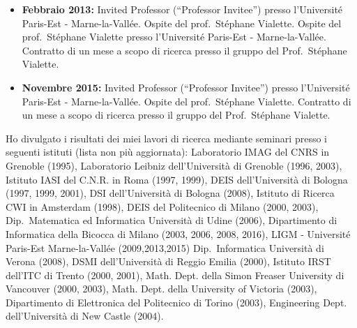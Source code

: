 \begin{itemize}
            Contratto di un mese a scopo di ricerca presso il gruppo del Prof.~St\'ephane Vialette.
      \item[] {\bf Febbraio 2013:} 
            Invited Professor (“Professor Invitee”) 
            presso l'Universit\'e Paris-Est - Marne-la-Vall\'ee.
            Ospite del prof.~St\'ephane Vialette.
            Ospite
            del prof.~St\'ephane Vialette
            presso l'Universit\'e Paris-Est - Marne-la-Vall\'ee.
            Contratto di un mese a scopo di ricerca presso il gruppo del Prof.~St\'ephane Vialette.
      \item[] {\bf Novembre 2015:} 
            Invited Professor (“Professor Invitee”) 
            presso l'Universit\'e Paris-Est - Marne-la-Vall\'ee.
            Ospite del prof.~St\'ephane Vialette.
            Contratto di un mese a scopo di ricerca presso il gruppo del Prof.~St\'ephane Vialette.
   \end{itemize}





Ho divulgato
i risultati dei miei lavori di ricerca mediante
seminari presso i seguenti istituti (lista non pi\`u aggiornata):
Laboratorio IMAG del CNRS in Grenoble (1995),
Laboratorio Leibniz dell'Universit\`a di Grenoble (1996, 2003),
Istituto IASI del C.N.R. in Roma (1997, 1999),
DEIS dell'Universit\`a di Bologna (1997, 1999, 2001),
DSI dell'Universit\`a di Bologna (2008),
Istituto di Ricerca CWI in Amsterdam (1998),
DEIS del Politecnico di Milano (2000, 2003),
Dip.~Matematica ed Informatica Universit\`a di Udine (2006),
Dipartimento di Informatica della Bicocca di Milano (2003, 2006, 2008, 2016),
LIGM - Université Paris-Est Marne-la-Vallée (2009,2013,2015)
Dip.~Informatica Universit\`a di Verona (2008),
DSMI dell'Universit\`a di Reggio Emilia (2000),
Istituto IRST dell'ITC di Trento (2000, 2001),
Math. Dept. della Simon Freaser University di Vancouver (2000, 2003),
Math. Dept. della University of Victoria (2003),
Dipartimento di Elettronica del Politecnico di Torino (2003),
Engineering Dept. dell'Universit\`a di New Castle (2004).\\






\vspace{1.8mm}

